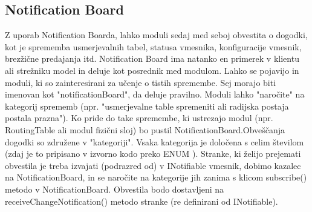 \documentclass[11pt,a4paper,slovene]{myarticle}
\begin{document}
\subsection{Notification Board}
Z uporab Notification Boarda, lahko moduli sedaj med seboj obvestita o dogodki, kot je sprememba usmerjevalnih tabel, statusa vmesnika, konfiguracije vmesnik, brezžične predajanja itd.
Notification Board ima natanko en primerek v klientu ali strežniku model in deluje kot posrednik med modulom.
Lahko se pojavijo in moduli, ki so zainteresirani za učenje o tistih spremembe. Sej morajo biti imenovan kot "notificationBoard", da deluje pravilno.
Moduli lahko "naročite" na kategorij sprememb (npr. "usmerjevalne table spremeniti ali radijska postaja postala prazna"). Ko pride do take spremembe, ki ustrezajo
modul (npr. ~ RoutingTable ali modul fizični sloj) bo pustil  NotificationBoard.Obveščanja dogodki so združene v "kategoriji".
Vsaka kategorija je določena s celim številom (zdaj je to pripisano v izvorno kodo preko ENUM ).
Stranke, ki želijo prejemati obvestila je treba izvajati (podrazred od) v INotifiable vmesnik, dobimo kazalec na NotificationBoard, in se naročite na kategorije jih zanima 
s klicom subscribe() metodo v NotificationBoard. Obvestila bodo dostavljeni na receiveChangeNotification() metodo stranke (re definirani od INotifiable).




\pagebreak


\end{document}
